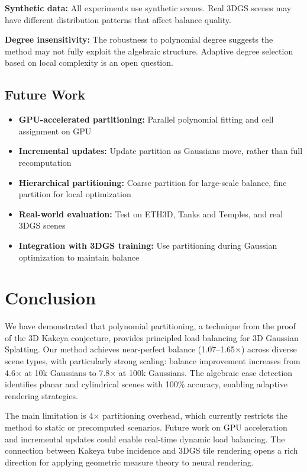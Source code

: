 \documentclass[10pt,twocolumn]{article}
\begin{document}
\textbf{Synthetic data:} All experiments use synthetic scenes. Real 3DGS scenes may have different distribution patterns that affect balance quality.

\textbf{Degree insensitivity:} The robustness to polynomial degree suggests the method may not fully exploit the algebraic structure. Adaptive degree selection based on local complexity is an open question.

\subsection{Future Work}

\begin{itemize}
    \item \textbf{GPU-accelerated partitioning:} Parallel polynomial fitting and cell assignment on GPU
    \item \textbf{Incremental updates:} Update partition as Gaussians move, rather than full recomputation
    \item \textbf{Hierarchical partitioning:} Coarse partition for large-scale balance, fine partition for local optimization
    \item \textbf{Real-world evaluation:} Test on ETH3D, Tanks and Temples, and real 3DGS scenes
    \item \textbf{Integration with 3DGS training:} Use partitioning during Gaussian optimization to maintain balance
\end{itemize}

\section{Conclusion}

We have demonstrated that polynomial partitioning, a technique from the proof of the 3D Kakeya conjecture, provides principled load balancing for 3D Gaussian Splatting. Our method achieves near-perfect balance (1.07--1.65$\times$) across diverse scene types, with particularly strong scaling: balance improvement increases from 4.6$\times$ at 10k Gaussians to 7.8$\times$ at 100k Gaussians. The algebraic case detection identifies planar and cylindrical scenes with 100\% accuracy, enabling adaptive rendering strategies.

The main limitation is 4$\times$ partitioning overhead, which currently restricts the method to static or precomputed scenarios. Future work on GPU acceleration and incremental updates could enable real-time dynamic load balancing. The connection between Kakeya tube incidence and 3DGS tile rendering opens a rich direction for applying geometric measure theory to neural rendering.
\end{document}
